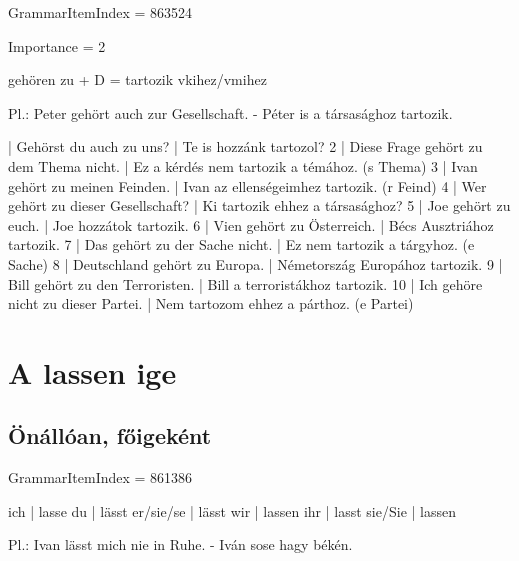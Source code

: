 \documentclass{article}
\newenvironment{desc}{\verbatim}{\endverbatim}
\newenvironment{exmp}{\verbatim}{\endverbatim}
\begin{document}
GrammarItemIndex = 863524

Importance = 2

\begin{desc}
gehören zu + D = tartozik vkihez/vmihez

Pl.: Peter gehört auch zur Gesellschaft. - Péter is a társasághoz tartozik.
\end{desc}

\begin{exmp}
1 | Gehörst du auch zu uns? | Te is hozzánk tartozol?
2 | Diese Frage gehört zu dem Thema nicht. | Ez a kérdés nem tartozik a témához. (s Thema)
3 | Ivan gehört zu meinen Feinden. | Ivan az ellenségeimhez tartozik. (r Feind)
4 | Wer gehört zu dieser Gesellschaft? | Ki tartozik ehhez a társasághoz?
5 | Joe gehört zu euch. | Joe hozzátok tartozik.
6 | Vien gehört zu Österreich. | Bécs Ausztriához tartozik.
7 | Das gehört zu der Sache nicht. | Ez nem tartozik a tárgyhoz. (e Sache)
8 | Deutschland gehört zu Europa. | Németország Europához tartozik.
9 | Bill gehört zu den Terroristen. | Bill a terroristákhoz tartozik.
10 | Ich gehöre nicht zu dieser Partei. | Nem tartozom ehhez a párthoz. (e Partei)
\end{exmp}

\section{A lassen ige}

\subsection{Önállóan, főigeként}

GrammarItemIndex = 861386

\begin{desc}
ich       | lasse
du        | lässt
er/sie/se | lässt
wir       | lassen
ihr       | lasst
sie/Sie   | lassen

Pl.: Ivan lässt mich nie in Ruhe. - Iván sose hagy békén.
\end{desc}
\end{document}
